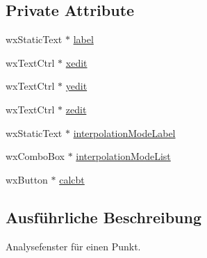 \subsection*{Private Attribute}
\begin{DoxyCompactItemize}
\item 
wx\-Static\-Text $\ast$ \hyperlink{classGUIAnalyzePointWindow_ae3f474800a7f7d9e4a897bdf33510f01}{label}
\item 
wx\-Text\-Ctrl $\ast$ \hyperlink{classGUIAnalyzePointWindow_a4c3d50b2c5c38b8b757cdb1c04ea83b6}{xedit}
\item 
wx\-Text\-Ctrl $\ast$ \hyperlink{classGUIAnalyzePointWindow_ac4352df05ac2a001551801a90fc8bc42}{yedit}
\item 
wx\-Text\-Ctrl $\ast$ \hyperlink{classGUIAnalyzePointWindow_a173e639b35cc6c18a74fb746b8664c8c}{zedit}
\item 
wx\-Static\-Text $\ast$ \hyperlink{classGUIAnalyzePointWindow_a6a1b5c74ab4aca0f3ccea3ef83043b35}{interpolation\-Mode\-Label}
\item 
wx\-Combo\-Box $\ast$ \hyperlink{classGUIAnalyzePointWindow_a6b2da34e788e56e70789d2cfc9767357}{interpolation\-Mode\-List}
\item 
wx\-Button $\ast$ \hyperlink{classGUIAnalyzePointWindow_a2650076436d57254fa9dd0df3783593e}{calcbt}
\end{DoxyCompactItemize}


\subsection{Ausführliche Beschreibung}
Analysefenster für einen Punkt. 

